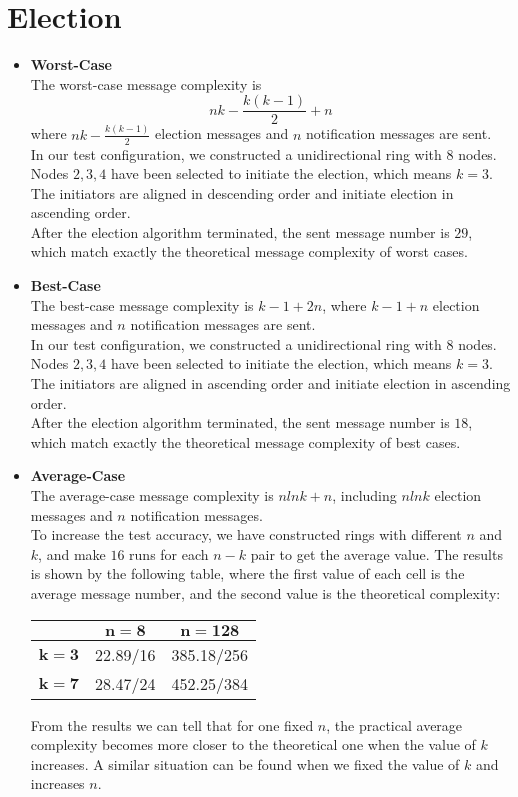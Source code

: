 \documentclass[a4paper, 14pt]{article}
\begin{document}
\section{Election}
\begin{itemize}
\item{\bf Worst-Case} \\
The worst-case message complexity is \[nk-\frac{k(k-1)}{2}+n\] where $nk-\frac{k(k-1)}{2}$ election messages and $n$ notification messages are sent. \\
In our test configuration, we constructed a unidirectional ring with 8 nodes. Nodes $2,3,4$ have been selected to initiate the election, which means $k=3$. The initiators are aligned in descending order and initiate election in ascending order.\\
After the election algorithm terminated,  the sent message number is $29$, which match exactly the theoretical message complexity of worst cases.

\item{\bf Best-Case} \\
The best-case message complexity is $k-1+2n$, where $k-1+n$ election messages and $n$ notification messages are sent. \\
In our test configuration, we constructed a unidirectional ring with 8 nodes. Nodes $2,3,4$ have been selected to initiate the election, which means $k=3$. The initiators are aligned in ascending order and initiate election in ascending order.\\
After the election algorithm terminated,  the sent message number is $18$, which match exactly the theoretical message complexity of best cases.

\item{\bf Average-Case} \\
The average-case message complexity is $nlnk+n$, including $nlnk$ election messages and $n$ notification messages.\\
To increase the test accuracy, we have constructed rings with different $n$ and $k$, and make $16$ runs for each $n-k$ pair to get the average value. The results is shown by the following table, where the first value of each cell is the average message number, and the second value is the theoretical complexity:
\begin{center}
\begin{tabular}[c]{c|c|c}
				& $\mathbf{n=8}$ 	& $\mathbf{n=128}$ \\
 \hline
 $\mathbf{k=3}$ 	& 22.89/16 				& 385.18/256\\
 \hline
 $\mathbf{k=7}$ 	& 	28.47/24		& 452.25/384\\

\end{tabular}
\end{center}
From the results we can tell that for one fixed $n$, the practical average complexity becomes more closer to   the theoretical one when the value of $k$ increases. A similar situation can be found when we fixed the value of $k$ and increases $n$.  
\end{itemize}
\end{document}
